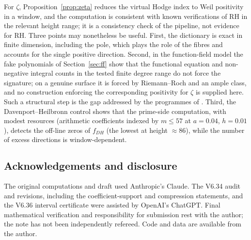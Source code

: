 \documentclass[11pt]{amsart}
\theoremstyle{remark}
\theoremstyle{definition}
\begin{document}
For $\zeta$, Proposition~\ref{prop:zeta} reduces the virtual Hodge index to Weil positivity in a window, and the computation is consistent with known verifications of RH in the relevant height range; it is a consistency check of the pipeline, not evidence for RH. Three points may nonetheless be useful. First, the dictionary is exact in finite dimension, including the pole, which plays the role of the fibres and accounts for the single positive direction. Second, in the function-field model the fake polynomials of Section~\ref{sec:ff} show that the functional equation and non-negative integral counts in the tested finite degree range do not force the signature; on a genuine surface it is forced by Riemann--Roch and an ample class, and no construction enforcing the corresponding positivity for $\zeta$ is supplied here. Such a structural step is the gap addressed by the programmes of \cite{Con99,CC14,CCM25}. Third, the Davenport--Heilbronn control shows that the prime-side computation, with modest resources (arithmetic coefficients indexed by $m\le57$ at $a=0.04$, $h=0.01$), detects the off-line zeros of $f_{DH}$ (the lowest at height $\approx86$), while the number of excess directions is window-dependent.

\subsection*{Acknowledgements and disclosure}
The original computations and draft used Anthropic's Claude. The V6.34 audit and revisions, including the coefficient-support and compression statements, and the V6.36 interval certificate were assisted by OpenAI's ChatGPT. Final mathematical verification and responsibility for submission rest with the author; the note has not been independently refereed. Code and data are available from the author.
\end{document}
